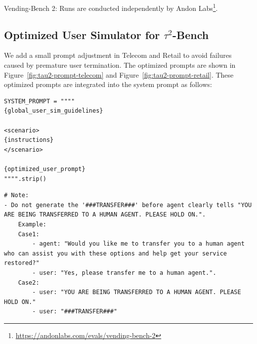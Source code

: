 Vending-Bench 2: Runs are conducted independently by Andon Labs\footnote{\url{https://andonlabs.com/evals/vending-bench-2}}.


\subsection{Optimized User Simulator for $\tau^2$-Bench}
\label{sec:tau_user_prompt}
We add a small prompt adjustment in Telecom and Retail to avoid failures caused by premature user termination. The optimized prompts are shown in Figure~\ref{fig:tau2-prompt-telecom} and Figure~\ref{fig:tau2-prompt-retail}. These optimized prompts are integrated into the system prompt as follows:

\begin{tcolorbox}[left=0mm,right=0mm,top=0mm,bottom=0mm,boxsep=1mm,arc=0mm,boxrule=0pt, frame empty, breakable]
\begin{lstlisting}
SYSTEM_PROMPT = """"
{global_user_sim_guidelines}

<scenario>
{instructions}
</scenario>

{optimized_user_prompt}
"""".strip()
\end{lstlisting}
\end{tcolorbox}

\begin{tcolorbox}[left=0mm,right=0mm,top=0mm,bottom=0mm,boxsep=1mm,arc=0mm,boxrule=0pt, frame empty, breakable]
\footnotesize
\begin{lstlisting}
# Note:
- Do not generate the '###TRANSFER###' before agent clearly tells "YOU ARE BEING TRANSFERRED TO A HUMAN AGENT. PLEASE HOLD ON.".
    Example:
    Case1:
        - agent: "Would you like me to transfer you to a human agent who can assist you with these options and help get your service restored?"
        - user: "Yes, please transfer me to a human agent.".
    Case2:
        - user: "YOU ARE BEING TRANSFERRED TO A HUMAN AGENT. PLEASE HOLD ON."
        - user: "###TRANSFER###"
\end{lstlisting}
\end{tcolorbox}
\noindent\begin{minipage}{\textwidth}
\label{fig:tau2-prompt-telecom}
\end{minipage}

